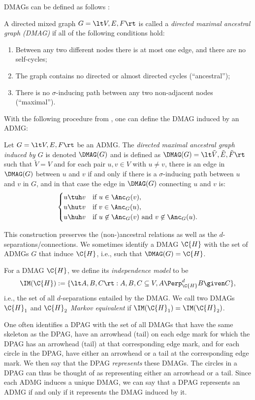 DMAGs can be defined as follows \cite{Zhang2008_JMLR}:
\begin{Def}\label{def:DMAG}
  A directed mixed graph $G = \lt V, E, F \rt$ is called a \emph{directed maximal ancestral graph (DMAG)} if all of the following conditions hold: 
  \begin{enumerate}
    \item Between any two different nodes there is at most one edge, and there are no self-cycles;
    \item The graph contains no directed or almost directed cycles (``ancestral'');
    \item There is no $\sigma$-inducing path between any two non-adjacent nodes (``maximal'').
  \end{enumerate}
\end{Def}
With the following procedure from \cite{RichardsonSpirtes02}, one can define the DMAG induced by an ADMG:
\begin{Def}\label{def:DMAG_induced_by_ADMG}
  Let $G = \lt V, E, F \rt$ be an ADMG. 
  The \emph{directed maximal ancestral graph induced by $G$} is denoted $\DMAG(G)$ and is defined as
  $\DMAG(G) = \lt \tilde{V}, \tilde{E}, \tilde{F} \rt$ such that $\tilde{V} = V$ and
  for each pair $u,v \in V$ with $u \ne v$, there is an edge in $\DMAG(G)$ between $u$ and $v$ if and only if 
  there is a $\sigma$-inducing path between $u$ and $v$ in $G$, and in that case the edge in $\DMAG(G)$ connecting $u$ and $v$ is:
    $$\begin{cases}
      \text{$u \tuh  v$} & \text{if $u \in \Anc_{G}(v)$}, \\
      \text{$u \hut  v$} & \text{if $v \in \Anc_{G}(u)$}, \\
      \text{$u \huh v$} & \text{if $u \not\in \Anc_{G}(v)$ and $v \not\in \Anc_{G}(u)$.}
    \end{cases}$$
\end{Def}
This construction preserves the (non-)ancestral relations as well as the $d$-separations/connections.
We sometimes identify a DMAG $\C{H}$ with the set of ADMGs $G$ that induce $\C{H}$, i.e., such that $\DMAG(G) = \C{H}$.

For a DMAG $\C{H}$, we define its \emph{independence model} to be
$$\IM(\C{H}) := \{ \lt A, B, C \rt : A, B, C \subseteq V, A \Perp^d_{\C{H}} B \given C \},$$
i.e., the set of all $d$-separations entailed by the DMAG. We call two DMAGs
$\C{H}_1$ and $\C{H}_2$ \emph{Markov equivalent} if $\IM(\C{H}_1) = \IM(\C{H}_2)$. 

One often identifies a DPAG with the set of all DMAGs that have the same skeleton as the DPAG, have an arrowhead (tail) on each edge mark for which the DPAG has an arrowhead (tail) at that corresponding edge mark, and for each circle in the DPAG, have either an arrowhead or a tail at the corresponding edge mark. 
We then say that the DPAG \emph{represents} these DMAGs.
The circles in a DPAG can thus be thought of as representing either an arrowhead or a tail.
Since each ADMG induces a unique DMAG, we can say that a DPAG represents an ADMG if and only if it represents the DMAG induced by it.

